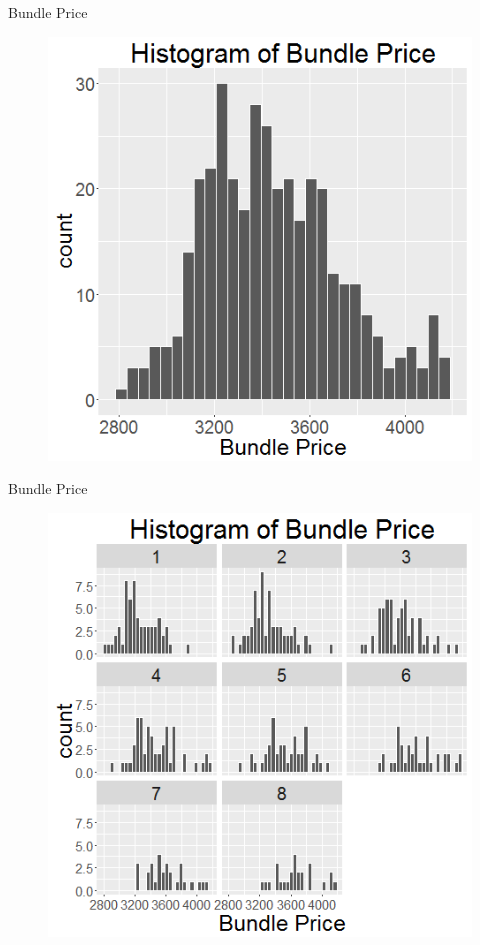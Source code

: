 \documentclass[xcolor=dvipsnames,12pt]{beamer}
\theoremstyle{definition}
\begin{document}
\begin{frame}{Bundle Price}
\begin{figure}
\graphicspath{ {../../0_relative_to_bundle_0/} }
\includegraphics[scale=0.43]{7_zz_histogram_bundle_price_zoom_in}
\end{figure}
\end{frame}

\begin{frame}{Bundle Price}
\begin{figure}
\graphicspath{ {../../0_relative_to_bundle_0/} }
\includegraphics[scale=0.43]{7_zzz_histogram_bundle_price_in_different_bundle_index_zoom_in}
\end{figure}
\end{frame}
\end{document}
